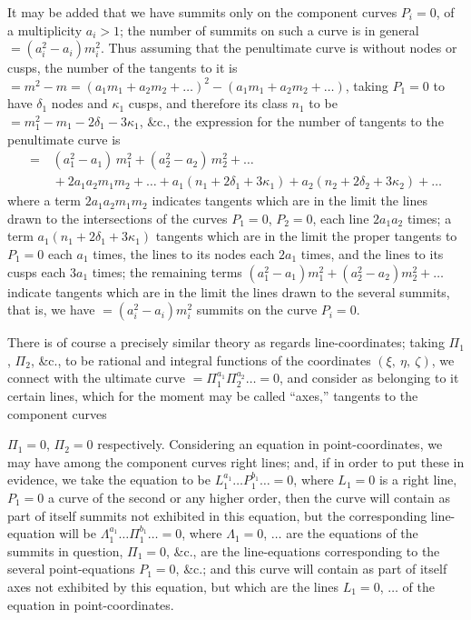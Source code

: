 \documentclass[12pt,a4paper,oneside]{book}
\begin{document}
It may be added that we have summits only on the component curves $P_{i}=0$, of a multiplicity $a_{i}>1$; the number of summits on such a curve is in general $=(a_{i}^{2}-a_{i})m_{i}^{2}$. Thus assuming that the penultimate curve is without nodes or cusps, the number of the tangents to it is $=m^{2}-m=(a_{1}m_{1}+a_{2}m_{2}+\dots)^{2}-(a_{1}m_{1}+a_{2}m_{2}+\dots)$, taking $P_{1}=0$ to have $\delta_{1}$ nodes and $\kappa_{1}$ cusps, and therefore its class $n_{1}$ to be $=m_{1}^{2}-m_{1}-2\delta_{1}-3\kappa_{1}$, \&c., the expression for the number of tangents to the penultimate curve is
\begin{align*}
=&\,(a_{1}^{2}-a_{1})\,m_{1}^{2}+(a_{2}^{2}-a_{2})\,m_{2}^{2}+\dots\\
&\,+2a_{1}a_{2}m_{1}m_{2}+\dots+a_{1}(n_{1}+2\delta_{1}+3\kappa_{1})+a_{2}(n_{2}+2\delta_{2}+3\kappa_{2})+\dots
\end{align*}
where a term $2a_{1}a_{2}m_{1}m_{2}$ indicates tangents which are in the limit the lines drawn to the intersections of the curves $P_{1}=0$, $P_{2}=0$, each line $2a_{1}a_{2}$ times; a term $a_{1}(n_{1}+2\delta_{1}+3\kappa_{1})$ tangents which are in the limit the proper tangents to $P_{1}=0$ each $a_{1}$ times, the lines to its nodes each $2a_{1}$ times, and the lines to its cusps each $3a_{1}$ times; the remaining terms $(a_{1}^{2}-a_{1})m_{1}^{2}+(a_{2}^{2}-a_{2})m_{2}^{2}+\dots$ indicate tangents which are in the limit the lines drawn to the several summits, that is, we have $=(a_{i}^{2}-a_{i})m_{i}^{2}$ summits on the curve $P_{i}=0$.

There is of course a precisely similar theory as regards line-coordinates; taking $\Pi_{1}$, $\Pi_{2}$, \&c., to be rational and integral functions of the coordinates $(\xi,\ \eta,\ \zeta)$, we connect with the ultimate curve $=\Pi_{1}^{a_{1}}\Pi_{2}^{a_{2}}\dots =0$, and consider as belonging to it certain lines, which for the moment may be called ``axes,'' tangents to the component curves

\newpage
$\Pi_{1}=0$, $\Pi_{2}=0$ respectively. Considering an equation in point-coordinates, we may have among the component curves right lines; and, if in order to put these in evidence, we take the equation to be $L_{1}^{a_{1}}\dots P_{1}^{b_{1}}\dots =0$, where $L_{1}=0$ is a right line, $P_{1}=0$ a curve of the second or any higher order, then the curve will contain as part of itself summits not exhibited in this equation, but the corresponding line-equation will be $\Lambda_{1}^{a_{1}}\dots \Pi_{1}^{b_{1}}\dots =0$, where $\Lambda_{1}=0$, $\dots$ are the equations of the summits in question, $\Pi_{1}=0$, \&c., are the line-equations corresponding to the several point-equations $P_{1}=0$, \&c.; and this curve will contain as part of itself axes not exhibited by this equation, but which are the lines $L_{1}=0$, $\dots$ of the equation in point-coordinates.
\end{document}
